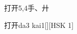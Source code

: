 \begin{entry}{打开}{5,4}{⼿、⼶}
  \begin{phonetics}{打开}{da3 kai1}[][HSK 1]
  \end{phonetics}
\end{entry}

